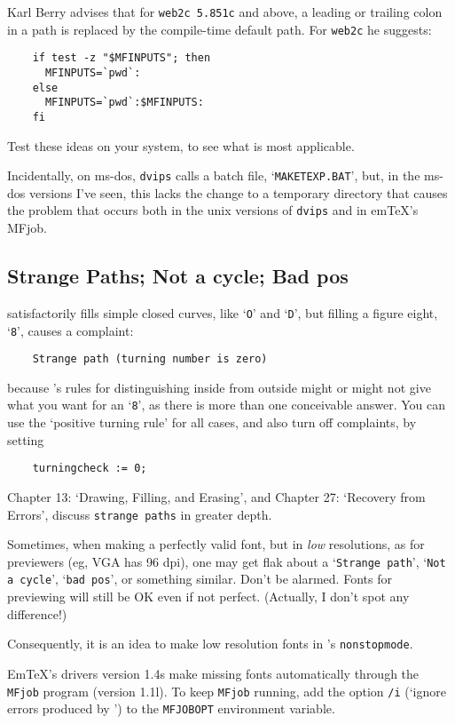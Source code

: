 Karl {\sc Berry} advises that for {\tt web2c 5.851c} and above,
a leading or trailing colon in a path is replaced by the compile-time
default path.  For {\tt web2c} he suggests:
\begin{verbatim}
    if test -z "$MFINPUTS"; then
      MFINPUTS=`pwd`:
    else
      MFINPUTS=`pwd`:$MFINPUTS:
    fi
\end{verbatim}

Test these ideas on your system, to see what is most applicable.

Incidentally, on {\sc ms-dos}, {\tt dvips} calls a batch file,
`{\tt MAKETEXP.BAT}', but, in the {\sc ms-dos} versions I've seen,
this lacks the change to a temporary directory that causes
the problem that occurs both in the {\sc unix} versions of {\tt dvips}
and in em\TeX{}'s MFjob.


\subsection{Strange Paths; Not a cycle; Bad pos}

\MF{} satisfactorily fills simple closed curves, like `{\tt O}'
and `{\tt D}', but filling a figure eight, `{\tt 8}', causes a
complaint:
\begin{verbatim}
    Strange path (turning number is zero)
\end{verbatim}
because \MF{}'s rules for distinguishing inside from outside
might or might not give what you want for an `{\tt 8}', as there is
more than one conceivable answer.  You can use the `positive turning
rule' for all cases, and also turn off complaints, by setting
\begin{verbatim}
    turningcheck := 0;
\end{verbatim}
Chapter 13:  `Drawing, Filling, and Erasing', and Chapter 27:
`Recovery from Errors', discuss {\tt strange paths} in greater
depth.


Sometimes, when making a perfectly valid font, but in {\em low\/}
resolutions, as for previewers (eg, VGA has 96 dpi), one may get
flak about a `{\tt Strange path}', `{\tt Not a cycle}',
`{\tt bad pos}', or something similar.  Don't be alarmed.  Fonts for
previewing will still be OK even if not perfect.  (Actually, I don't
spot any difference!)

Consequently, it is an idea to make low resolution fonts in
\MF{}'s \hbox{\tt nonstopmode}.

Em\TeX{}'s drivers version 1.4s make missing fonts automatically
through the {\tt MFjob} program (version 1.1l).  To keep {\tt MFjob}
running, add the option {\tt /i} (`ignore errors produced by \MF{}')
to the {\tt MFJOBOPT} environment variable.

